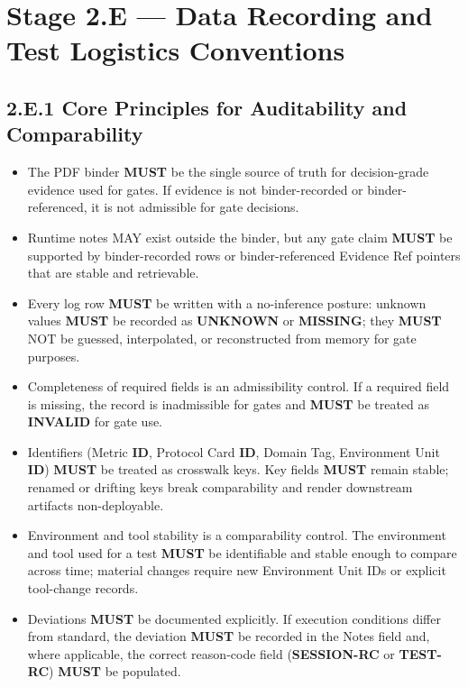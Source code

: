 \documentclass[10pt]{article}
\begin{document}
\section*{Stage 2.E — Data Recording and Test Logistics Conventions}
{}

\subsection*{2.E.1 Core Principles for Auditability and Comparability}
{}

\begin{itemize}
\item The PDF binder \textbf{MUST} be the single source of truth for decision-grade evidence used for gates. If evidence is not binder-recorded or binder-referenced, it is not admissible for gate decisions.
\item Runtime notes MAY exist outside the binder, but any gate claim \textbf{MUST} be supported by binder-recorded rows or binder-referenced Evidence Ref pointers that are stable and retrievable.
\item Every log row \textbf{MUST} be written with a no-inference posture: unknown values \textbf{MUST} be recorded as \textbf{UNKNOWN} or \textbf{MISSING}; they \textbf{MUST} NOT be guessed, interpolated, or reconstructed from memory for gate purposes.
\item Completeness of required fields is an admissibility control. If a required field is missing, the record is inadmissible for gates and \textbf{MUST} be treated as \textbf{INVALID} for gate use.
\item Identifiers (Metric \textbf{ID}, Protocol Card \textbf{ID}, Domain Tag, Environment Unit \textbf{ID}) \textbf{MUST} be treated as crosswalk keys. Key fields \textbf{MUST} remain stable; renamed or drifting keys break comparability and render downstream artifacts non-deployable.
\item Environment and tool stability is a comparability control. The environment and tool used for a test \textbf{MUST} be identifiable and stable enough to compare across time; material changes require new Environment Unit IDs or explicit tool-change records.
\item Deviations \textbf{MUST} be documented explicitly. If execution conditions differ from standard, the deviation \textbf{MUST} be recorded in the Notes field and, where applicable, the correct reason-code field (\textbf{SESSION-RC} or \textbf{TEST-RC}) \textbf{MUST} be populated.

\end{itemize}
\end{document}
